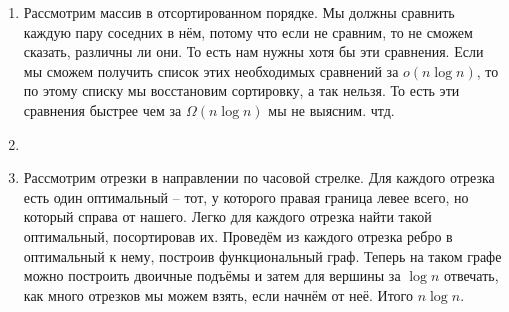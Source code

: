 \documentclass[12pt]{article}
\begin{document}
\begin{enumerate}
	\setlength{\parskip}{0pt} 
	\setlength{\itemsep}{0pt} 
	\item Рассмотрим массив в отсортированном порядке. Мы должны сравнить каждую пару соседних в нём, потому что если не сравним, то не сможем сказать, различны ли они. То есть нам нужны хотя бы эти сравнения. Если мы сможем получить список этих необходимых сравнений за $o(n\log n)$, то по этому списку мы восстановим сортировку, а так нельзя. То есть эти сравнения быстрее чем за $\Omega(n\log n)$ мы не выясним. чтд. \\
	\item ~\\
	\item Рассмотрим отрезки в направлении по часовой стрелке. Для каждого отрезка есть один оптимальный -- тот, у которого правая граница левее всего, но который справа от нашего. Легко для каждого отрезка найти такой оптимальный, посортировав их. Проведём из каждого отрезка ребро в оптимальный к нему, построив функциональный граф. Теперь на таком графе можно построить двоичные подъёмы и затем для вершины за $\log n$ отвечать, как много отрезков мы можем взять, если начнём от неё. Итого $n \log n$.
\end{enumerate}
\end{document}
